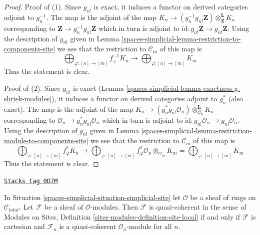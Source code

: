 \begin{proof}
Proof of (1). Since $g_{n!}$ is exact, it induces a functor
on derived categories adjoint to $g_n^{-1}$.
The map is the adjoint of the map
$K_n \to (g_n^{-1}g_{n!}\mathbf{Z}) \otimes^\mathbf{L}_\mathbf{Z} K_n$
corresponding to $\mathbf{Z} \to g_n^{-1}g_{n!}\mathbf{Z}$
which in turn is adjoint to
$\text{id} : g_{n!}\mathbf{Z} \to g_{n!}\mathbf{Z}$.
Using the description of $g_{n!}$
given in Lemma \ref{spaces-simplicial-lemma-restriction-to-components-site}
we see that the restriction to $\mathcal{C}_m$ of this map
is
$$
\bigoplus\nolimits_{\varphi : [n] \to [m]} f_\varphi^{-1}K_n
\longrightarrow
\bigoplus\nolimits_{\varphi : [n] \to [m]} K_m
$$
Thus the statement is clear.

\medskip\noindent
Proof of (2). Since $g_{n!}$ is exact
(Lemma \ref{spaces-simplicial-lemma-exactness-g-shriek-modules}), it induces a functor
on derived categories adjoint to $g_n^*$ (also exact).
The map is the adjoint of the map
$K_n \to (g_n^*g_{n!}\mathcal{O}_n) \otimes^\mathbf{L}_{\mathcal{O}_n} K_n$
corresponding to $\mathcal{O}_n \to g_n^*g_{n!}\mathcal{O}_n$
which in turn is adjoint to
$\text{id} : g_{n!}\mathcal{O}_n \to g_{n!}\mathcal{O}_n$.
Using the description of $g_{n!}$
given in Lemma \ref{spaces-simplicial-lemma-restriction-module-to-components-site}
we see that the restriction to $\mathcal{C}_m$ of this map
is
$$
\bigoplus\nolimits_{\varphi : [n] \to [m]} f_\varphi^*K_n
\longrightarrow
\bigoplus\nolimits_{\varphi : [n] \to [m]}
f_\varphi^*\mathcal{O}_n \otimes_{\mathcal{O}_m} K_m =
\bigoplus\nolimits_{\varphi : [n] \to [m]} K_m
$$
Thus the statement is clear.
\end{proof}

\begin{lemma}
\label{spaces-simplicial-lemma-quasi-coherent-sheaf}
\href{https://stacks.math.columbia.edu/tag/0D7M}{\texttt{Stacks tag 0D7M}}

In Situation \ref{spaces-simplicial-situation-simplicial-site}
let $\mathcal{O}$ be a sheaf of rings on $\mathcal{C}_{total}$.
Let $\mathcal{F}$ be a sheaf of $\mathcal{O}$-modules.
Then $\mathcal{F}$ is quasi-coherent in the sense of
Modules on Sites, Definition \ref{sites-modules-definition-site-local}
if and only if $\mathcal{F}$ is cartesian
and $\mathcal{F}_n$ is a quasi-coherent $\mathcal{O}_n$-module for all $n$.
\end{lemma}

